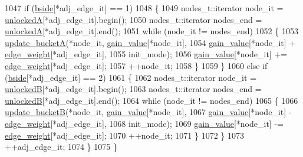 \begin{DoxyCode}
1047         \textcolor{keywordflow}{if} (\mbox{\hyperlink{classratio__cut__partition_ab9c1166efb1cbb65ff6c55bb6e3c9e6d}{bside}}[*adj\_edge\_it] == 1)
1048         \{
1049             nodes\_t::iterator node\_it = \mbox{\hyperlink{classratio__cut__partition_a9e4d0ba86475bd0faa98e01c6be4dde0}{unlockedA}}[*adj\_edge\_it].begin();
1050             nodes\_t::iterator nodes\_end = \mbox{\hyperlink{classratio__cut__partition_a9e4d0ba86475bd0faa98e01c6be4dde0}{unlockedA}}[*adj\_edge\_it].end();
1051             \textcolor{keywordflow}{while} (node\_it != nodes\_end)
1052             \{
1053                 \mbox{\hyperlink{classratio__cut__partition_acbd0608a7e5560a52c447711cb59a644}{update\_bucketA}}(*node\_it, \mbox{\hyperlink{classratio__cut__partition_af24ff191abbb0578f0bfc54fef5f6d45}{gain\_value}}[*node\_it],
1054                     \mbox{\hyperlink{classratio__cut__partition_af24ff191abbb0578f0bfc54fef5f6d45}{gain\_value}}[*node\_it] + \mbox{\hyperlink{classratio__cut__partition_a48a85c82fb09b83c9d494d6d1232fab2}{edge\_weight}}[*adj\_edge\_it],
1055                     init\_mode);
1056                 \mbox{\hyperlink{classratio__cut__partition_af24ff191abbb0578f0bfc54fef5f6d45}{gain\_value}}[*node\_it] += \mbox{\hyperlink{classratio__cut__partition_a48a85c82fb09b83c9d494d6d1232fab2}{edge\_weight}}[*adj\_edge\_it];
1057                 ++node\_it;
1058             \}
1059         \}
1060         \textcolor{keywordflow}{else} \textcolor{keywordflow}{if} (\mbox{\hyperlink{classratio__cut__partition_ab9c1166efb1cbb65ff6c55bb6e3c9e6d}{bside}}[*adj\_edge\_it] == 2)
1061         \{
1062             nodes\_t::iterator node\_it = \mbox{\hyperlink{classratio__cut__partition_af7c877d8c6e9b533ab34cde1c6690b25}{unlockedB}}[*adj\_edge\_it].begin();
1063             nodes\_t::iterator nodes\_end = \mbox{\hyperlink{classratio__cut__partition_af7c877d8c6e9b533ab34cde1c6690b25}{unlockedB}}[*adj\_edge\_it].end();
1064             \textcolor{keywordflow}{while} (node\_it != nodes\_end)
1065             \{
1066                 \mbox{\hyperlink{classratio__cut__partition_abe5d474e6d99c7bb200071d6484b5358}{update\_bucketB}}(*node\_it, \mbox{\hyperlink{classratio__cut__partition_af24ff191abbb0578f0bfc54fef5f6d45}{gain\_value}}[*node\_it],
1067                     \mbox{\hyperlink{classratio__cut__partition_af24ff191abbb0578f0bfc54fef5f6d45}{gain\_value}}[*node\_it] - \mbox{\hyperlink{classratio__cut__partition_a48a85c82fb09b83c9d494d6d1232fab2}{edge\_weight}}[*adj\_edge\_it],
1068                     init\_mode);
1069                 \mbox{\hyperlink{classratio__cut__partition_af24ff191abbb0578f0bfc54fef5f6d45}{gain\_value}}[*node\_it] -= \mbox{\hyperlink{classratio__cut__partition_a48a85c82fb09b83c9d494d6d1232fab2}{edge\_weight}}[*adj\_edge\_it];
1070                 ++node\_it;
1071             \}
1072         \}
1073         ++adj\_edge\_it;
1074     \}
1075 \}
\end{DoxyCode}
